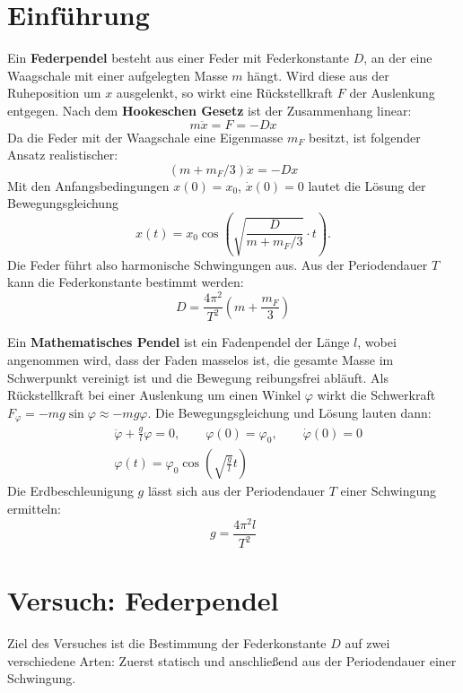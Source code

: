 \section{Einführung}
Ein \textbf{Federpendel} besteht aus einer Feder mit Federkonstante $D$, an der eine Waagschale mit einer aufgelegten Masse $m$ hängt. Wird diese aus der Ruheposition um $x$ ausgelenkt, so wirkt eine Rückstellkraft $F$ der Auslenkung entgegen. Nach dem \textbf{Hookeschen Gesetz} ist der Zusammenhang linear:
\begin{equation}
  m\ddot{x}=F=-D x
  \label{eq:hook}
\end{equation}
Da die Feder mit der Waagschale eine Eigenmasse $m_F$ besitzt, ist folgender Ansatz realistischer:
\begin{equation}
  (m+m_F/3)\ddot{x}=-D x
  \label{eq:hookreal}
\end{equation}
Mit den Anfangsbedingungen $x(0)=x_0$, $\dot{x}(0)=0$ lautet die Lösung der Bewegungsgleichung
\begin{equation}
  x(t)=x_0 \cos\left(\sqrt{\frac{D}{m+m_F/3}}\cdot t\right).
  \label{eq:federloesung}
\end{equation}
Die Feder führt also harmonische Schwingungen aus. Aus der Periodendauer $T$ kann die Federkonstante bestimmt werden:
\begin{equation}
  D=\frac{4\pi^2}{T^2}\left(m+\frac{m_F}{3}\right)
  \label{eq:federkonst}
\end{equation}

Ein \textbf{Mathematisches Pendel} ist ein Fadenpendel der Länge $l$, wobei angenommen wird, dass der Faden masselos ist, die gesamte Masse im Schwerpunkt vereinigt ist und die Bewegung reibungsfrei abläuft. Als Rückstellkraft bei einer Auslenkung um einen Winkel $\varphi$ wirkt die Schwerkraft $F_\varphi=-mg\sin\varphi\approx -mg\varphi$. Die Bewegungsgleichung und Lösung lauten dann:
\begin{align}
  &\ddot{\varphi}+\frac{g}{l}\varphi=0, \qquad \varphi(0)=\varphi_0, \qquad \dot{\varphi}(0)=0 \\
  &\varphi(t)=\varphi_0 \cos\left(\sqrt{\frac{g}{l}}t\right)
  \label{eq:pendelbwgl}
\end{align}
Die Erdbeschleunigung $g$ lässt sich aus der Periodendauer $T$ einer Schwingung ermitteln:
\begin{equation}
  g=\frac{4\pi^2l}{T^2}
  \label{eq:erdbeschl}
\end{equation}
\section{Versuch: Federpendel}
Ziel des Versuches ist die Bestimmung der Federkonstante $D$ auf zwei verschiedene Arten: Zuerst statisch und anschließend aus der Periodendauer einer Schwingung.

